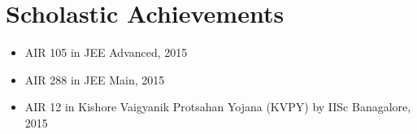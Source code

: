 \section*{\sc Scholastic Achievements}
\vspace{-2mm}
\hrulefill
\vspace{.2cm}

\begin{itemize}
\item AIR 105 in JEE Advanced, 2015
\item AIR 288 in JEE Main, 2015
\item AIR 12 in Kishore Vaigyanik Protsahan Yojana (KVPY) by IISc Banagalore, 2015
\end{itemize}